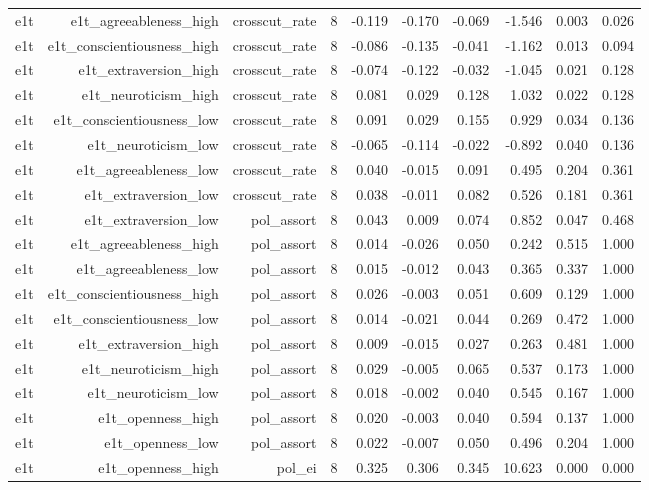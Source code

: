 \documentclass[11pt]{article}
\begin{document}
\begin{landscape}
\begin{longtable}{@{}lrrrrrrrrr@{}}
e1t & e1t\_agreeableness\_high & crosscut\_rate & 8 & -0.119 & -0.170 & -0.069 & -1.546 & 0.003 & 0.026 \\
e1t & e1t\_conscientiousness\_high & crosscut\_rate & 8 & -0.086 & -0.135 & -0.041 & -1.162 & 0.013 & 0.094 \\
e1t & e1t\_extraversion\_high & crosscut\_rate & 8 & -0.074 & -0.122 & -0.032 & -1.045 & 0.021 & 0.128 \\
e1t & e1t\_neuroticism\_high & crosscut\_rate & 8 & 0.081 & 0.029 & 0.128 & 1.032 & 0.022 & 0.128 \\
e1t & e1t\_conscientiousness\_low & crosscut\_rate & 8 & 0.091 & 0.029 & 0.155 & 0.929 & 0.034 & 0.136 \\
e1t & e1t\_neuroticism\_low & crosscut\_rate & 8 & -0.065 & -0.114 & -0.022 & -0.892 & 0.040 & 0.136 \\
e1t & e1t\_agreeableness\_low & crosscut\_rate & 8 & 0.040 & -0.015 & 0.091 & 0.495 & 0.204 & 0.361 \\
e1t & e1t\_extraversion\_low & crosscut\_rate & 8 & 0.038 & -0.011 & 0.082 & 0.526 & 0.181 & 0.361 \\
e1t & e1t\_extraversion\_low & pol\_assort & 8 & 0.043 & 0.009 & 0.074 & 0.852 & 0.047 & 0.468 \\
e1t & e1t\_agreeableness\_high & pol\_assort & 8 & 0.014 & -0.026 & 0.050 & 0.242 & 0.515 & 1.000 \\
e1t & e1t\_agreeableness\_low & pol\_assort & 8 & 0.015 & -0.012 & 0.043 & 0.365 & 0.337 & 1.000 \\
e1t & e1t\_conscientiousness\_high & pol\_assort & 8 & 0.026 & -0.003 & 0.051 & 0.609 & 0.129 & 1.000 \\
e1t & e1t\_conscientiousness\_low & pol\_assort & 8 & 0.014 & -0.021 & 0.044 & 0.269 & 0.472 & 1.000 \\
e1t & e1t\_extraversion\_high & pol\_assort & 8 & 0.009 & -0.015 & 0.027 & 0.263 & 0.481 & 1.000 \\
e1t & e1t\_neuroticism\_high & pol\_assort & 8 & 0.029 & -0.005 & 0.065 & 0.537 & 0.173 & 1.000 \\
e1t & e1t\_neuroticism\_low & pol\_assort & 8 & 0.018 & -0.002 & 0.040 & 0.545 & 0.167 & 1.000 \\
e1t & e1t\_openness\_high & pol\_assort & 8 & 0.020 & -0.003 & 0.040 & 0.594 & 0.137 & 1.000 \\
e1t & e1t\_openness\_low & pol\_assort & 8 & 0.022 & -0.007 & 0.050 & 0.496 & 0.204 & 1.000 \\
e1t & e1t\_openness\_high & pol\_ei & 8 & 0.325 & 0.306 & 0.345 & 10.623 & 0.000 & 0.000 \\

\end{longtable}
\end{landscape}
\end{document}
